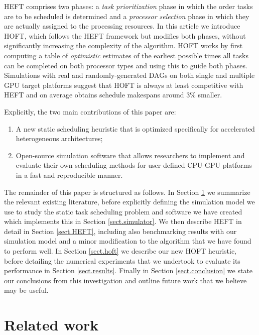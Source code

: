 \documentclass[runningheads]{llncs}
\begin{document}
HEFT comprises two phases: a {\em task prioritization} phase in which the order tasks are to be scheduled is determined and a {\em processor selection} phase in which they are actually assigned to the processing resources. In this article we introduce HOFT, which follows the HEFT framework but modifies both phases, without significantly increasing the complexity of the algorithm. HOFT works by first computing a table of {\em optimistic} estimates of the earliest possible times all tasks can be completed on both processor types and using this to guide both phases. Simulations with real and randomly-generated DAGs on both single and multiple GPU target platforms suggest that HOFT is always at least competitive with HEFT and on average obtains schedule makespans around $3\%$ smaller.          

Explicitly, the two main contributions of this paper are:
\begin{enumerate}	
	\item A new static scheduling heuristic that is optimized specifically for accelerated heterogeneous architectures;
	\item Open-source simulation software that allows researchers to implement and evaluate their own scheduling methods for user-defined CPU-GPU platforms in a fast and reproducible manner.
\end{enumerate} 
The remainder of this paper is structured as follows. In Section \ref{sect.lit_review} we summarize the relevant existing literature, before explicitly defining the simulation model we use to study the static task scheduling problem and software we have created which implements this in Section \ref{sect.simulator}. We then describe HEFT in detail in Section \ref{sect.HEFT}, including also benchmarking results with our simulation model and a minor modification to the algorithm that we have found to perform well. In Section \ref{sect.hoft} we describe our new HOFT heuristic, before detailing the numerical experiments that we undertook to evaluate its performance in Section \ref{sect.results}. Finally in Section \ref{sect.conclusion} we state our conclusions from this investigation and outline future work that we believe may be useful.
 
\section{Related work}
\label{sect.lit_review}
\end{document}
